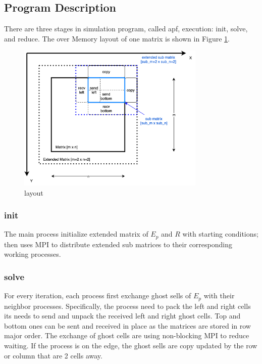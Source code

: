 \documentclass[12pt]{article}
\begin{document}
\subsection{Program Description}
There are three stages in simulation program, called apf, execution:
init, solve, and reduce.
The over Memory layout of one matrix is shown in Figure \ref{fig:layout}.

\begin{figure}[h]
    \centering
    \includegraphics[width=0.8\textwidth]{img/layout.png}
    \caption{layout}
    \label{fig:layout}
\end{figure}

\subsubsection{init}
The main process initialize extended matrix of $E_p$ and $R$ with starting conditions;
then uses MPI to distribute extended sub matrices to their corresponding working processes.

\subsubsection{solve}
For every iteration, 
each process first exchange ghost sells of $E_p$ with their neighbor processes.
Specifically, the process need to pack the left and right cells its needs to send
and unpack the received left and right ghost cells.
Top and bottom ones can be sent and received in place as the matrices are stored in row major order.
The exchange of ghost cells are using non-blocking MPI to reduce waiting.
If the process is on the edge, the ghost sells are copy updated by the row or column that are 2 cells away.
\end{document}
